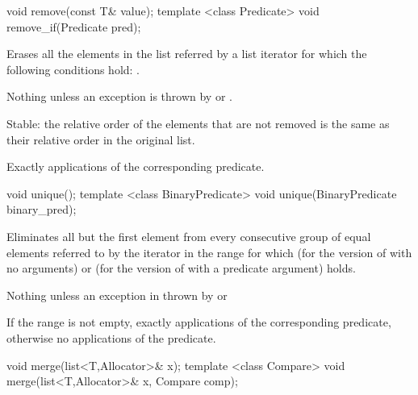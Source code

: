 %
\begin{itemdecl}
                           void remove(const T& value);
template <class Predicate> void remove_if(Predicate pred);
\end{itemdecl}

\begin{itemdescr}
\pnum
\effects
Erases all the elements in the list referred by a list iterator  for which the
following conditions hold: .

\pnum
\throws
Nothing unless an exception is thrown by
or
.

\pnum
\notes
Stable: the relative order of the elements that are not removed is the same
as their relative order in the original list.

\pnum
\complexity
Exactly
applications of the corresponding predicate.
\end{itemdescr}

%
\begin{itemdecl}
                                 void unique();
template <class BinaryPredicate> void unique(BinaryPredicate binary_pred);
\end{itemdecl}

\begin{itemdescr}
\pnum
\effects
Eliminates all but the first element from every
consecutive group of equal elements referred to by the iterator  in the range
 for which  (for the version of
 with no arguments) or  (for the version of
 with a predicate argument) holds.

\pnum
\throws
Nothing unless an exception in thrown by
or

\pnum
\complexity
If the range
is not empty, exactly
applications of the corresponding predicate,
otherwise no applications of the predicate.
\end{itemdescr}

%
\begin{itemdecl}
void   merge(list<T,Allocator>& x);
template <class Compare> void merge(list<T,Allocator>& x, Compare comp);
\end{itemdecl}

